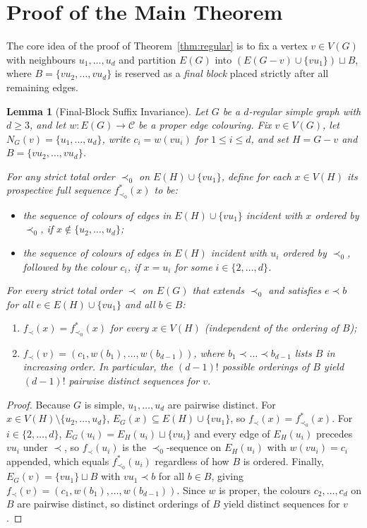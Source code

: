 \documentclass[11pt,a4paper]{article}
\newtheorem{lemma}[theorem]{Lemma}
\begin{document}
\section{Proof of the Main Theorem}

The core idea of the proof of Theorem~\ref{thm:regular} is to fix a vertex $v \in V(G)$ with neighbours $u_1, \dots, u_d$ and partition $E(G)$ into $(E(G - v) \cup \{v u_1\}) \sqcup B$, where $B = \{v u_2, \dots, v u_d\}$ is reserved as a \emph{final block} placed strictly after all remaining edges.

\begin{lemma}[Final-Block Suffix Invariance]
\label{lem:block}
Let $G$ be a $d$-regular simple graph with $d \ge 3$, and let $w : E(G) \to \mathcal{C}$ be a proper edge colouring. Fix $v \in V(G)$, let $N_G(v) = \{u_1, \dots, u_d\}$, write $c_i = w(v u_i)$ for $1 \le i \le d$, and set $H = G - v$ and $B = \{v u_2, \dots, v u_d\}$.

For any strict total order $\prec_0$ on $E(H) \cup \{v u_1\}$, define for each $x \in V(H)$ its \emph{prospective full sequence} $f^*_{\prec_0}(x)$ to be:
\begin{itemize}
  \item the sequence of colours of edges in $E(H) \cup \{v u_1\}$ incident with $x$ ordered by $\prec_0$, if $x \notin \{u_2, \dots, u_d\}$;
  \item the sequence of colours of edges in $E(H)$ incident with $u_i$ ordered by $\prec_0$, followed by the colour $c_i$, if $x = u_i$ for some $i \in \{2, \dots, d\}$.
\end{itemize}
For every strict total order $\prec$ on $E(G)$ that extends $\prec_0$ and satisfies $e \prec b$ for all $e \in E(H) \cup \{v u_1\}$ and all $b \in B$:
\begin{enumerate}
  \item $f_\prec(x) = f^*_{\prec_0}(x)$ for every $x \in V(H)$ (independent of the ordering of $B$);
  \item $f_\prec(v) = (c_1, w(b_1), \dots, w(b_{d-1}))$, where $b_1 \prec \dots \prec b_{d-1}$ lists $B$ in increasing order. In particular, the $(d-1)!$ possible orderings of $B$ yield $(d-1)!$ pairwise distinct sequences for $v$.
\end{enumerate}
\end{lemma}

\begin{proof}
Because $G$ is simple, $u_1, \dots, u_d$ are pairwise distinct. For $x \in V(H) \setminus \{u_2, \dots, u_d\}$, $E_G(x) \subseteq E(H) \cup \{v u_1\}$, so $f_\prec(x) = f^*_{\prec_0}(x)$. For $i \in \{2, \dots, d\}$, $E_G(u_i) = E_H(u_i) \sqcup \{v u_i\}$ and every edge of $E_H(u_i)$ precedes $v u_i$ under $\prec$, so $f_\prec(u_i)$ is the $\prec_0$-sequence on $E_H(u_i)$ with $w(v u_i) = c_i$ appended, which equals $f^*_{\prec_0}(u_i)$ regardless of how $B$ is ordered. Finally, $E_G(v) = \{v u_1\} \sqcup B$ with $v u_1 \prec b$ for all $b \in B$, giving $f_\prec(v) = (c_1, w(b_1), \dots, w(b_{d-1}))$. Since $w$ is proper, the colours $c_2, \dots, c_d$ on $B$ are pairwise distinct, so distinct orderings of $B$ yield distinct sequences for $v$.
\end{proof}
\end{document}
